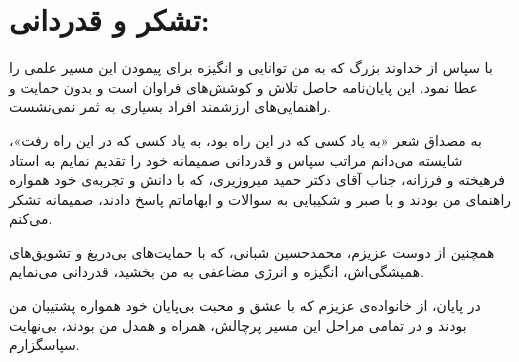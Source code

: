 \chapter*{\vspace{-2.38cm}\fontsize{15}{16}\selectfont تشکر و قدردانی:}

{\fontsize{12}{12}\selectfont
با سپاس از خداوند بزرگ که به من توانایی و انگیزه برای پیمودن این مسیر علمی را عطا نمود. این پایان‌نامه حاصل تلاش و کوشش‌های فراوان است و بدون حمایت و راهنمایی‌های ارزشمند افراد بسیاری به ثمر نمی‌نشست.

به مصداق شعر «به یاد کسی که در این راه بود، به یاد کسی که در این راه رفت»، شایسته می‌دانم مراتب سپاس و قدردانی صمیمانه خود را تقدیم نمایم به استاد فرهیخته و فرزانه، جناب آقای دکتر حمید میروزیری، که با دانش و تجربه‌ی خود همواره راهنمای من بودند و با صبر و شکیبایی به سوالات و ابهاماتم پاسخ دادند، صمیمانه تشکر می‌کنم.

همچنین از دوست عزیزم، محمدحسین شبانی، که با حمایت‌های بی‌دریغ و تشویق‌های همیشگی‌اش، انگیزه و انرژی مضاعفی به من بخشید، قدردانی می‌نمایم.

در پایان، از خانواده‌ی عزیزم که با عشق و محبت بی‌پایان خود همواره پشتیبان من بودند و در تمامی مراحل این مسیر پرچالش، همراه و همدل من بودند، بی‌نهایت سپاسگزارم.
}

